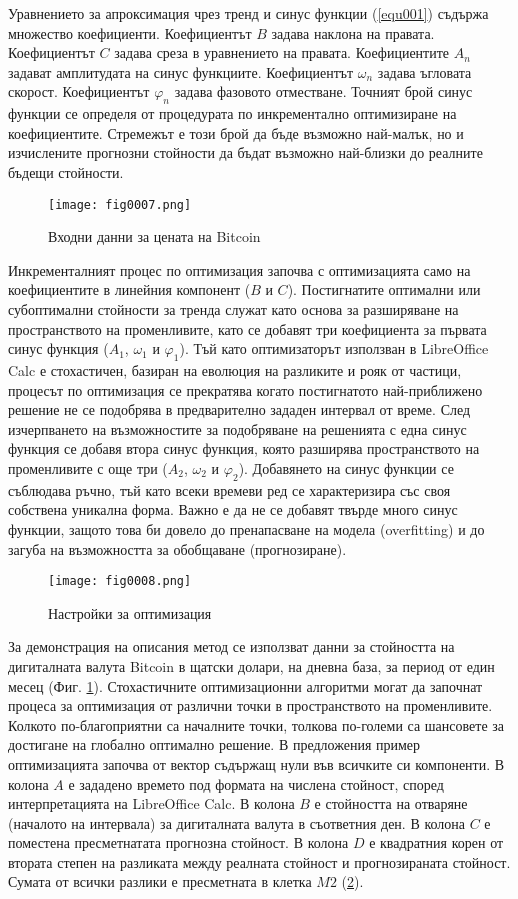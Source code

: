 Уравнението за апроксимация чрез тренд и синус функции (\ref{equ001}) съдържа множество коефициенти. Коефициентът $B$ задава наклона на правата. Коефициентът $C$ задава среза в уравнението на правата. Коефициентите $A_n$ задават амплитудата на синус функциите. Коефициентът $\omega_n$ задава ъгловата скорост. Коефициентът $\varphi_n$ задава фазовото отместване. Точният брой синус функции се определя от процедурата по инкрементално оптимизиране на коефициентите. Стремежът е този брой да бъде възможно най-малък, но и изчислените прогнозни стойности да бъдат възможно най-близки до реалните бъдещи стойности. 

\begin{figure}[H]
  \centering
  \texttt{[image: fig0007.png]}
  \caption{Входни данни за цената на Bitcoin}
\label{fig0007}
\end{figure}

Инкременталният процес по оптимизация започва с оптимизацията само на коефициентите в линейния компонент ($B$ и $C$). Постигнатите оптимални или субоптимални стойности за тренда служат като основа за разширяване на пространството на променливите, като се добавят три коефициента за първата синус функция ($A_1$, $\omega_1$ и $\varphi_1$). Тъй като оптимизаторът използван в LibreOffice Calc е стохастичен, базиран на еволюция на разликите и рояк от частици, процесът по оптимизация се прекратява когато постигнатото най-приближено решение не се подобрява в предварително зададен интервал от време. След изчерпването на възможностите за подобряване на решенията с една синус функция се добавя втора синус функция, която разширява пространството на променливите с още три ($A_2$, $\omega_2$ и $\varphi_2$). Добавянето на синус функции се съблюдава ръчно, тъй като всеки времеви ред се характеризира със своя собствена уникална форма. Важно е да не се добавят твърде много синус функции, защото това би довело до пренапасване на модела (overfitting) и до загуба на възможността за обобщаване (прогнозиране).

\begin{figure}[H]
  \centering
  \texttt{[image: fig0008.png]}
  \caption{Настройки за оптимизация}
\label{fig0008}
\end{figure}

За демонстрация на описания метод се използват данни за стойността на дигиталната валута Bitcoin в щатски долари, на дневна база, за период от един месец (Фиг. \ref{fig0007}). Стохастичните оптимизационни алгоритми могат да започнат процеса за оптимизация от различни точки в пространството на променливите. Колкото по-благоприятни са началните точки, толкова по-големи са шансовете за достигане на глобално оптимално решение. В предложения пример оптимизацията започва от вектор съдържащ нули във всичките си компоненти. В колона $A$ е зададено времето под формата на числена стойност, според интерпретацията на LibreOffice Calc. В колона $B$ е стойността на отваряне (началото на интервала) за дигиталната валута в съответния ден. В колона $C$ е поместена пресметнатата прогнозна стойност. В колона $D$ е квадратния корен от втората степен на разликата между реалната стойност и прогнозираната стойност. Сумата от всички разлики е пресметната в клетка $M2$ (\ref{fig0008}).

